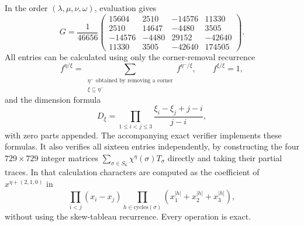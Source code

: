 \documentclass[11pt]{article}
\begin{document}
In the order $(\lambda,\mu,\nu,\omega)$, evaluation gives
\begin{equation}\label{matrix}
 G=\frac1{46656}
 \begin{pmatrix}
 15604&2510&-14576&11330\\
 2510&14647&-4480&3505\\
 -14576&-4480&29152&-42640\\
 11330&3505&-42640&174505
 \end{pmatrix}.
\end{equation}
All entries can be calculated using only the corner-removal recurrence
\[
 f^{\eta/\xi}=
 \sum_{\substack{\eta^-\text{ obtained by removing a corner}\\
                         \xi\subseteq\eta^-}} f^{\eta^-/\xi},
 \qquad f^{\xi/\xi}=1,
\]
and the dimension formula
\[
 D_\xi=\prod_{1\le i<j\le3}\frac{\xi_i-\xi_j+j-i}{j-i},
\]
with zero parts appended. The accompanying exact verifier implements
these formulas. It also verifies all sixteen entries independently,
by constructing the four $729\times729$ integer matrices
$\sum_{\sigma\in S_6}\chi^\eta(\sigma)T_\sigma$ directly and taking
their partial traces. In that calculation characters are computed as
the coefficient of $x^{\eta+(2,1,0)}$ in
\[
 \prod_{i<j}(x_i-x_j)\prod_{h\in\mathrm{cycles}(\sigma)}
          (x_1^{|h|}+x_2^{|h|}+x_3^{|h|}),
\]
without using the skew-tableau recurrence. Every operation is exact.
\end{document}

